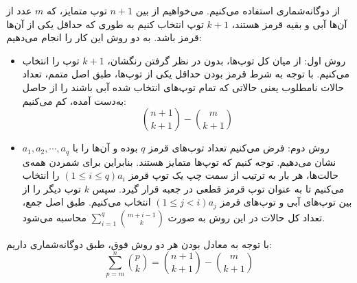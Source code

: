 \p		
از دوگانه‌شماری استفاده می‌کنیم. می‌خواهیم از بین
$n + 1$
توپ متمایز، که 
$m$
عدد از آن‌ها آبی و بقیه قرمز هستند، 
$k + 1$
توپ انتخاب کنیم به طوری که حداقل یکی از آن‌ها قرمز باشد. به دو روش این کار را انجام می‌دهیم:
\begin{itemize}
\item
روش اول: 
از میان کل توپ‌ها، بدون در نظر گرفتن رنگشان،
 $k + 1$
توپ را انتخاب می‌کنیم. با توجه به شرط قرمز بودن حداقل یکی از توپ‌ها، طبق اصل متمم، تعداد حالات نامطلوب یعنی حالاتی که تمام توپ‌های انتخاب شده آبی باشند را از حاصل به‌دست آمده، کم می‌کنیم:
$$\binom{n + 1}{k + 1} - \binom{m}{k + 1}$$
\item 
روش دوم:
فرض می‌کنیم تعداد توپ‌های قرمز
$q$
بوده و آن‌ها را با
$a_1, a_2, \cdots, a_q$
نشان می‌دهیم. 
توجه کنیم که توپ‌ها متمایز هستند. بنابراین برای شمردن همه‌ی حالت‌ها، هر بار به ترتیب از سمت چپ یک توپ قرمز 
$(1\leq i\leq q) a_i$
 را انتخاب می‌کنیم تا به عنوان توپ قرمز قطعی در جعبه قرار گیرد.
سپس 
 $k$
 توپ دیگر را از بین توپ‌های آبی و توپ‌های قرمز 
 $(1\leq j<i) a_j$
  انتخاب می‌کنیم.
طبق اصل جمع، تعداد کل حالات در این روش به صورت
 $\sum\limits_{i=1}^{q}\binom{m+i-1}{k}$
محاسبه می‌شود.

\leftline{$\rule{0.4\textwidth}{0.5pt}$}
\leftline{$\rule{0.4\textwidth}{0.5pt}$}
\leftline{$\rule{0.4\textwidth}{0.5pt}$}
\leftline{$\rule{0.4\textwidth}{0.5pt}$}
\leftline{$\rule{0.4\textwidth}{0.5pt}$}

\end{itemize}
با ‌توجه به معادل بودن هر دو روش فوق، طبق دوگانه‌شماری داریم:
$$\sum\limits_{p=m}^{n}\binom{p}{k} = \binom{n + 1}{k + 1} - \binom{m}{k + 1}$$